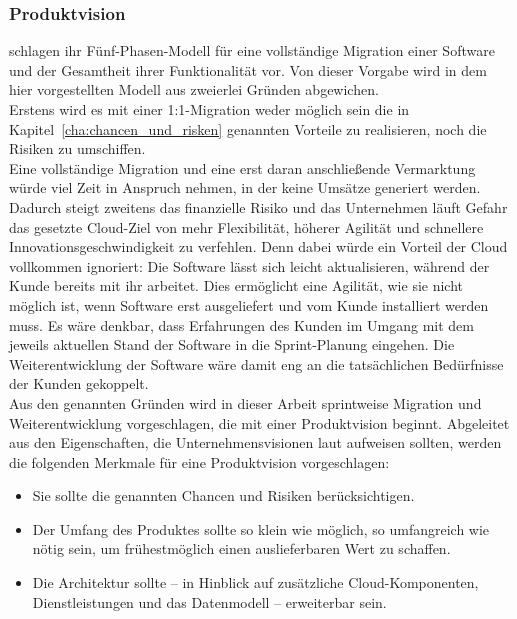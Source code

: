 \subsubsection{Produktvision}
 schlagen ihr Fünf-Phasen-Modell für eine vollständige 
Migration einer Software und der Gesamtheit ihrer Funktionalität vor. Von 
dieser Vorgabe wird in dem hier vorgestellten Modell aus zweierlei Gründen 
abgewichen. \\
Erstens wird es mit einer 1:1-Migration weder möglich sein die in 
Kapitel~\ref{cha:chancen_und_risken} genannten Vorteile zu realisieren, noch 
die Risiken zu umschiffen. \\
Eine vollständige Migration und eine erst daran anschließende Vermarktung würde 
viel Zeit in Anspruch nehmen, in der keine Umsätze generiert werden. Dadurch 
steigt zweitens das finanzielle Risiko und das Unternehmen läuft Gefahr das 
gesetzte Cloud-Ziel von mehr Flexibilität, höherer Agilität und schnellere 
Innovationsgeschwindigkeit zu verfehlen. Denn dabei würde ein Vorteil der 
Cloud vollkommen ignoriert: Die Software lässt sich leicht aktualisieren, 
während der Kunde bereits mit ihr arbeitet. Dies ermöglicht eine Agilität, wie 
sie nicht möglich ist, wenn Software erst ausgeliefert und vom Kunde installiert 
werden muss. Es wäre denkbar, dass Erfahrungen des Kunden im Umgang mit dem 
jeweils aktuellen Stand der Software in die Sprint-Planung eingehen. Die 
Weiterentwicklung der Software wäre damit eng an die tatsächlichen Bedürfnisse 
der Kunden gekoppelt. \\

Aus den genannten Gründen wird in dieser Arbeit sprintweise Migration und 
Weiterentwicklung vorgeschlagen, die mit einer Produktvision beginnt. 
Abgeleitet aus den Eigenschaften, die Unternehmensvisionen laut 
 aufweisen sollten, werden die folgenden Merkmale 
für eine Produktvision vorgeschlagen:
\begin{itemize}
	\item Sie sollte die genannten Chancen und Risiken berücksichtigen.
	\item Der Umfang des Produktes sollte so klein wie möglich, so 
umfangreich wie nötig sein, um frühestmöglich einen auslieferbaren Wert zu 
schaffen. 
	\item Die Architektur sollte -- in Hinblick auf zusätzliche 
Cloud-Komponenten, Dienstleistungen und das Datenmodell -- erweiterbar sein.
\end{itemize} 


